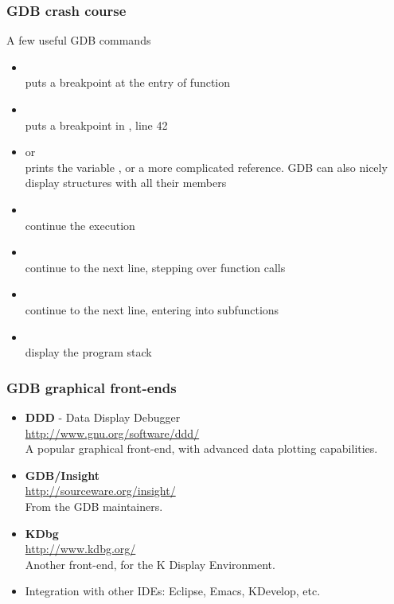 \begin{frame}
  \frametitle{GDB crash course}
  A few useful GDB commands
  \begin{itemize}
  \item {}\\
    puts a breakpoint at the entry of function 
  \item {}\\
    puts a breakpoint in , line 42
  \item {} or \\
    prints the variable , or a more complicated reference. GDB
    can also nicely display structures with all their members
  \item {}\\
    continue the execution
  \item {}\\
    continue to the next line, stepping over function calls
  \item {}\\
    continue to the next line, entering into subfunctions
  \item {}\\
    display the program stack
  \end{itemize}
\end{frame}

\begin{frame}
  \frametitle{GDB graphical front-ends}
  \begin{itemize}
  \item {\bf DDD} - Data Display Debugger\\
    \url{http://www.gnu.org/software/ddd/}\\
    A popular graphical front-end, with advanced data plotting
    capabilities.
  \item {\bf GDB/Insight}\\
    \url{http://sourceware.org/insight/}\\
    From the GDB maintainers.
  \item {\bf KDbg}\\
    \url{http://www.kdbg.org/}\\
    Another front-end, for the K Display Environment.
  \item Integration with other IDEs: Eclipse, Emacs, KDevelop, etc.\\
  \end{itemize}
\end{frame}


